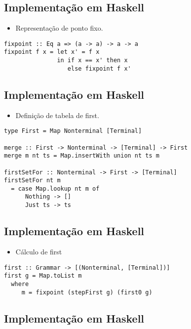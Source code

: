 \documentclass[11pt]{article}
\begin{document}
\subsection*{Implementação em Haskell}
\label{sec:orgb0e2b15}

\begin{itemize}
\item Representação de ponto fixo.
\end{itemize}

\begin{verbatim}
fixpoint :: Eq a => (a -> a) -> a -> a
fixpoint f x = let x' = f x
               in if x == x' then x
                  else fixpoint f x'
\end{verbatim}
\subsection*{Implementação em Haskell}
\label{sec:org9e43c18}

\begin{itemize}
\item Definição de tabela de first.
\end{itemize}

\begin{verbatim}
type First = Map Nonterminal [Terminal]

merge :: First -> Nonterminal -> [Terminal] -> First
merge m nt ts = Map.insertWith union nt ts m

firstSetFor :: Nonterminal -> First -> [Terminal]
firstSetFor nt m
  = case Map.lookup nt m of
      Nothing -> []
      Just ts -> ts
\end{verbatim}
\subsection*{Implementação em Haskell}
\label{sec:orge6a7272}

\begin{itemize}
\item Cálculo de first
\end{itemize}

\begin{verbatim}
first :: Grammar -> [(Nonterminal, [Terminal])]
first g = Map.toList m
  where
     m = fixpoint (stepFirst g) (first0 g)
\end{verbatim}
\subsection*{Implementação em Haskell}
\label{sec:org6480083}
\end{document}
